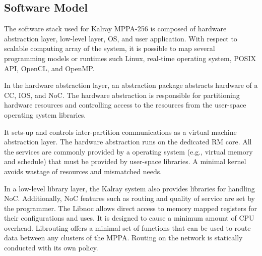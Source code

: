 \documentclass[conference,compsoc]{IEEEtran}
\newcommand{\comment}[1]{}
\begin{document}
\vspace{-3mm}
\subsection{Software Model}
\label{sec:software_model}
\vspace{-3mm}
The software stack used for Kalray MPPA-256 is composed of hardware abstraction layer, low-level layer, OS, and user application.
With respect to scalable computing array of the system, it is possible to map several programming models or runtimes such Linux, real-time operating system, POSIX API, OpenCL, and OpenMP.

In the hardware abstraction layer, an abstraction package abstracts hardware of a CC, IOS, and NoC.
\comment{1-15} %
The hardware abstraction is responsible for partitioning hardware resources and controlling access to the resources from the user-space operating system libraries.
\comment{1-16} 
It sets-up and controls inter-partition communications as a virtual machine abstraction layer.
The hardware abstraction runs on the dedicated RM core.
All the services are commonly provided by a operating system (e.g., virtual memory and schedule) that must be provided by user-space libraries.
A minimal kernel avoids wastage of resources and mismatched needs.

In a low-level library layer, the Kalray system also provides libraries for handling NoC.
Additionally, NoC features such as routing and quality of service are set by the programmer.
The Libnoc allows direct access to memory mapped registers for their configurations and uses.
It is designed to cause a minimum amount of CPU overhead.
Librouting offers a minimal set of functions that can be used to route data between any clusters of the MPPA.
Routing on the network is statically conducted with its own policy.
\end{document}
